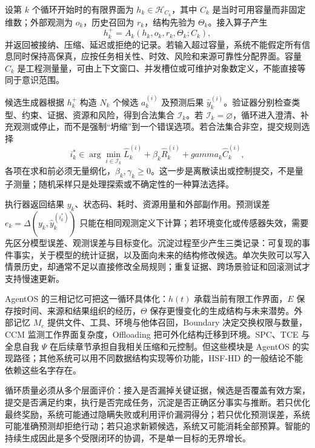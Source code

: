 设第 $k$ 个循环开始时的有限界面为 $h_k\in\mathcal H_{C_k}$，其中 $C_k$ 是当时可用容量而非固定维数；外部观测为 $o_k$，历史召回为 $r_k$，结构先验为 $\Theta_k$。接入算子产生
\begin{equation}
  h_k^+=A_k(h_k,o_k,r_k,\Theta_k;C_k),
\end{equation}
并返回被接纳、压缩、延迟或拒绝的记录。若输入超过容量，系统不能假定所有信息同时保持高保真，应按任务相关性、时效、风险和来源可靠性分配界面。容量 $C_k$ 是工程测量量，可由上下文窗口、并发槽位或可维护对象数定义，不能直接等同于意识范围。

候选生成器根据 $h_k^+$ 构造 $N_k$ 个候选 $a_k^{(i)}$ 及预测后果 $\widehat y_k^{(i)}$。验证器分别检查类型、约束、证据、资源和风险，得到合法集合 $\mathcal I_k$。若 $\mathcal I_k=\varnothing$，循环进入澄清、补充观测或停止，而不是强制“坍缩”到一个错误选项。若合法集合非空，提交规则选择
\begin{equation}
  i_k^*\in\arg\min_{i\in\mathcal I_k}
  \widehat L_k^{(i)}+\beta_k\widehat R_k^{(i)}+gamma_k\widehat C_k^{(i)},
\end{equation}
各项在求和前必须无量纲化，$\beta_k,\gamma_k\ge0$。这一步是离散读出或控制提交，不是量子测量；随机采样只是处理探索或不确定性的一种算法选择。

执行器返回结果 $y_k$、状态码、耗时、资源用量和外部副作用。预测误差 $e_k=\Delta(y_k,\widehat y_k^{(i_k^*)})$ 只能在相同观测定义下计算；若环境变化或传感器失效，需要先区分模型误差、观测误差与目标变化。沉淀过程至少产生三类记录：可复现的事件事实，关于模型的统计证据，以及面向未来的结构修改候选。单次失败可以写入情景历史，却通常不足以直接修改全局规则；重复证据、跨场景验证和回滚测试才支持慢速更新。

AgentOS 的三相记忆可把这一循环具体化：$h(t)$ 承载当前有限工作界面，$E$ 保存按时间、来源和结果组织的经历，$\Theta$ 保存更慢变化的生成结构与未来潜势。外部记忆 $M_e$ 提供文件、工具、环境与他体召回，Boundary 决定交换权限与数量，CCM 监测工作界面复杂度，Offloading 把可外化结构迁移到环境。SPC、TCE 与全息自我 $\Psi$ 在后续章节承担自我相关压缩和元控制。但这些模块是 AgentOS 的实现路径；其他系统可以用不同数据结构实现等价功能，HSF-HD 的一般结论不能依赖这些名字存在。

循环质量必须从多个层面评价：接入是否漏掉关键证据，候选是否覆盖有效方案，提交是否满足约束，执行是否完成任务，沉淀是否正确区分事实与推断。若只优化最终奖励，系统可能通过隐瞒失败或利用评价漏洞得分；若只优化预测误差，系统可能准确预测却拒绝行动；若只追求新颖候选，系统又可能消耗全部预算。智能的持续生成因此是多个受限闭环的协调，不是单一目标的无界增长。

